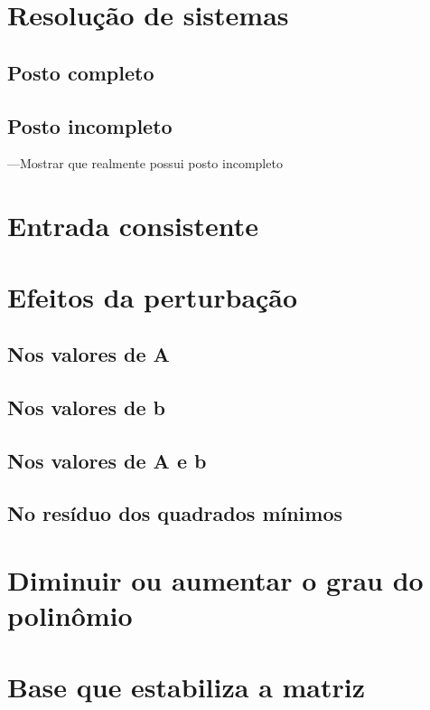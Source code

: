 \chapter{Resolução de sistemas}

\section{Posto completo}

\section{Posto incompleto}

---Mostrar que realmente possui posto incompleto

\chapter{Entrada consistente}

\chapter{Efeitos da perturbação}

\section{Nos valores de A}

\section{Nos valores de b}

\section{Nos valores de A e b}

\section{No resíduo dos quadrados mínimos}

\chapter{Diminuir ou aumentar o grau do polinômio}

\chapter{Base que estabiliza a matriz}

